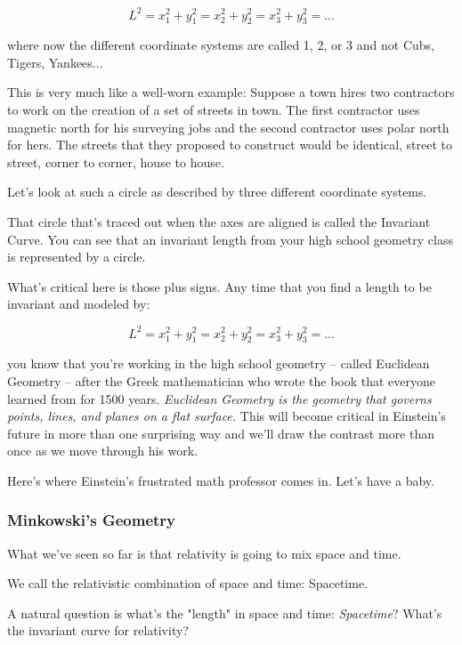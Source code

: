 \documentclass[
]{article}
\begin{document}
\[L^2 = x_1^2 + y_1^2 = x_2^2 + y_2^2 = x_3^2 + y_3^2 = ... \nonumber\]

where now the different coordinate systems are called 1, 2, or 3 and not
Cubs, Tigers, Yankees...

This is very much like a well-worn example: Suppose a town hires two
contractors to work on the creation of a set of streets in town. The
first contractor uses magnetic north for his surveying jobs and the
second contractor uses polar north for hers. The streets that they
proposed to construct would be identical, street to street, corner to
corner, house to house.

Let's look at such a circle as described by three different coordinate
systems.



  

That circle that's traced out when the axes are aligned is called the
Invariant Curve. You can see that an invariant length from your high
school geometry class is represented by a circle.

What's critical here is those plus signs. Any time that you find a
length to be invariant and modeled by:

\[L^2 = x_1^2 + y_1^2 = x_2^2 + y_2^2 = x_3^2 + y_3^2 = ... \nonumber\]

you know that you're working in the high school geometry -- called
Euclidean Geometry -- after the Greek mathematician who wrote the book
that everyone learned from for 1500 years. \emph{Euclidean Geometry is
the geometry that governs points, lines, and planes on a flat surface.}
This will become critical in Einstein's future in more than one
surprising way and we'll draw the contrast more than once as we move
through his work.

Here's where Einstein's frustrated math professor comes in. Let's have a
baby.

\hypertarget{minkowskis-geometry}{%
\subsubsection{Minkowski's Geometry}\label{minkowskis-geometry}}

What we've seen so far is that relativity is going to mix space and
time.

We call the relativistic combination of space and time: Spacetime. 

A natural question is what's the "length" in space and time:
\emph{Spacetime}? What's the invariant curve for relativity?
\end{document}
